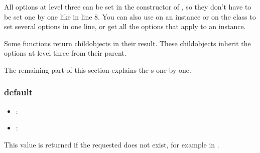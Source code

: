 \documentclass[a4paper,10pt,english]{sphinxmanual}
\begin{document}
\sphinxAtStartPar
All \sphinxhyphen{}options at level three can be set in the constructor of , so they don’t have to be set one by one like in line 8. You can also use  on an instance or on the \sphinxhyphen{}class to set several options in one line, or get all the options that apply to an instance.

\sphinxAtStartPar
Some \sphinxhyphen{}functions return child\sphinxhyphen{}\sphinxhyphen{}objects in their result. These child\sphinxhyphen{}objects inherit the options at level three from their parent.

\sphinxAtStartPar
The remaining part of this section explains the s one by one.


\subsubsection{default}
\label{\detokenize{README:default}}\begin{itemize}
\item {}
\sphinxAtStartPar
{}: 

\item {}
\sphinxAtStartPar
{}: 

\end{itemize}

\sphinxAtStartPar
This value is returned if the requested {\hyperref[\detokenize{README:the-path-parameter}]{}} does not exist, for example in {\hyperref[\detokenize{README:the-path-parameter}]{}}.
\end{document}
